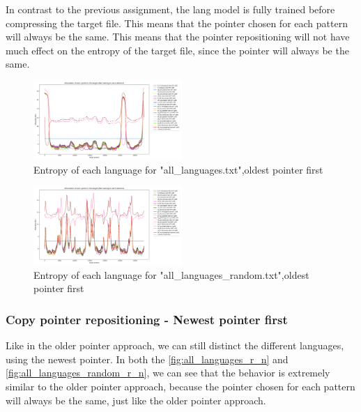\documentclass{article}
\begin{document}
In contrast to the previous assignment, the lang model is fully trained before compressing the target file. This means that the pointer chosen for each pattern will always be the same.
This means that the pointer repositioning will not have much effect on the entropy of the target file, since the pointer will always be the same.

\begin{figure}
    \centering
    \includegraphics[width=0.5\textwidth]{../results/all_languages/-r_o.png}
    \caption{Entropy of each language for "all_languages.txt",oldest pointer first}
    \label{fig:all_languages_r_o}
\end{figure}

\begin{figure}
    \centering
    \includegraphics[width=0.5\textwidth]{../results/all_languages_random/-r_o.png}
    \caption{Entropy of each language for "all_languages_random.txt",oldest pointer first}
    \label{fig:all_languages_random_r_o}
\end{figure}

\subsubsection{Copy pointer repositioning - Newest pointer first}
\label{subsubsec:results_locate_lang_newest_pointer_first}

Like in the older pointer approach, we can still distinct the different languages, using the newest pointer.
In both the \ref{fig:all_languages_r_n} and \ref{fig:all_languages_random_r_n}, we can see that the behavior is extremely similar to the older pointer approach,
because the pointer chosen for each pattern will always be the same, just like the older pointer approach.
\end{document}
